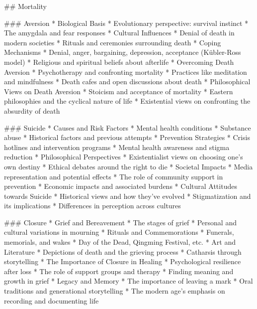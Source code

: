 
## Mortality

### Aversion
   * Biological Basis
      * Evolutionary perspective: survival instinct
      * The amygdala and fear responses
   * Cultural Influences
      * Denial of death in modern societies
      * Rituals and ceremonies surrounding death
   * Coping Mechanisms
      * Denial, anger, bargaining, depression, acceptance (Kübler-Ross model)
      * Religious and spiritual beliefs about afterlife
   * Overcoming Death Aversion
      * Psychotherapy and confronting mortality
      * Practices like meditation and mindfulness
      * Death cafes and open discussions about death
   * Philosophical Views on Death Aversion
      * Stoicism and acceptance of mortality
      * Eastern philosophies and the cyclical nature of life
      * Existential views on confronting the absurdity of death

### Suicide
   * Causes and Risk Factors
      * Mental health conditions
      * Substance abuse
      * Historical factors and previous attempts
   * Prevention Strategies
      * Crisis hotlines and intervention programs
      * Mental health awareness and stigma reduction
   * Philosophical Perspectives
      * Existentialist views on choosing one's own destiny
      * Ethical debates around the right to die
   * Societal Impacts
      * Media representation and potential effects
      * The role of community support in prevention
      * Economic impacts and associated burdens
   * Cultural Attitudes towards Suicide
      * Historical views and how they've evolved
      * Stigmatization and its implications
      * Differences in perception across cultures

### Closure
   * Grief and Bereavement
      * The stages of grief
      * Personal and cultural variations in mourning
   * Rituals and Commemorations
      * Funerals, memorials, and wakes
      * Day of the Dead, Qingming Festival, etc.
   * Art and Literature
      * Depictions of death and the grieving process
      * Catharsis through storytelling
   * The Importance of Closure in Healing
      * Psychological resilience after loss
      * The role of support groups and therapy
      * Finding meaning and growth in grief
   * Legacy and Memory
      * The importance of leaving a mark
      * Oral traditions and generational storytelling
      * The modern age's emphasis on recording and documenting life

